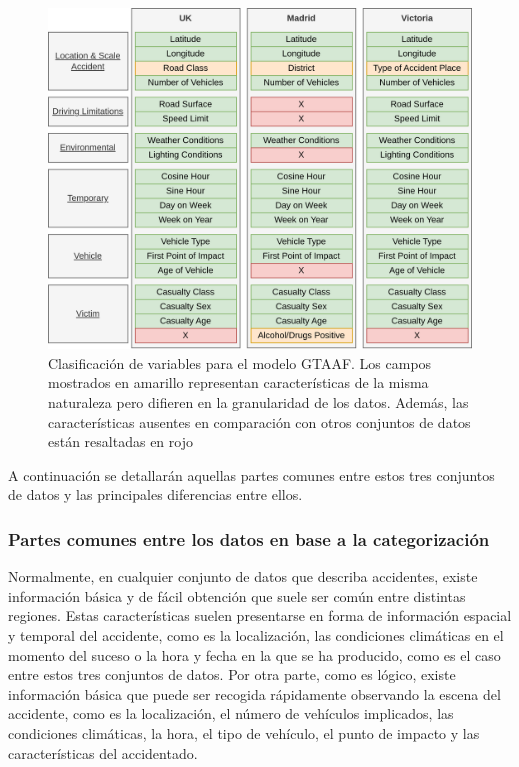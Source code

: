 \begin{figure}[H]
	\centering
	\includegraphics[width=14cm]{Figures/Dataset Comparative.png}
	\caption[Clasificación de variables para el modelo GTAAF]{Clasificación de variables para el modelo GTAAF. Los campos mostrados en amarillo representan características de la misma naturaleza pero difieren en la granularidad de los datos. Además, las características ausentes en comparación con otros conjuntos de datos están resaltadas en rojo}
	\label{FeaturesClassification}
\end{figure}

A continuación se detallarán aquellas partes comunes entre estos tres conjuntos de datos y las principales diferencias entre ellos.

\subsubsection*{Partes comunes entre los datos en base a la categorización}

Normalmente, en cualquier conjunto de datos que describa accidentes, existe información básica y de fácil obtención que suele ser común entre distintas regiones. Estas características suelen presentarse en forma de información espacial y temporal del accidente, como es la localización, las condiciones climáticas en el momento del suceso o la hora y fecha en la que se ha producido, como es el caso entre estos tres conjuntos de datos. Por otra parte, como es lógico, existe información básica que puede ser recogida rápidamente observando la escena del accidente, como es la localización, el número de vehículos implicados, las condiciones climáticas, la hora, el tipo de vehículo, el punto de impacto y las características del accidentado.


